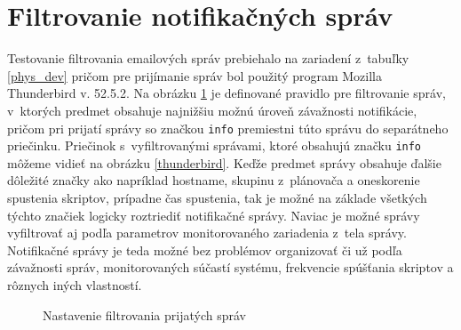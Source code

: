 \section{Filtrovanie notifikačných správ}
Testovanie filtrovania emailových správ prebiehalo na zariadení z~tabuľky \ref{phys_dev} pričom pre prijímanie správ bol použitý program Mozilla Thunderbird v. 52.5.2. Na obrázku \ref{thunderbird_filter_settings} je definované pravidlo pre filtrovanie správ, v~ktorých predmet obsahuje najnižšiu možnú úroveň závažnosti notifikácie, pričom pri prijatí správy so značkou \texttt{info} premiestni túto správu do separátneho priečinku. Priečinok s~vyfiltrovanými správami, ktoré obsahujú značku \texttt{info} môžeme vidieť na obrázku \ref{thunderbird}. Keďže predmet správy obsahuje ďalšie dôležité značky ako napríklad hostname, skupinu z~plánovača a oneskorenie spustenia skriptov, prípadne čas spustenia, tak je možné na základe všetkých týchto značiek logicky roztriediť notifikačné správy. Naviac je možné správy vyfiltrovať aj podľa parametrov monitorovaného zariadenia z~tela správy. Notifikačné správy je teda možné bez problémov organizovať či už podľa závažnosti správ, monitorovaných súčastí systému, frekvencie spúšťania skriptov a rôznych iných vlastností.
\\
\begin{figure}[H]
	\begin{center}
		\vspace{-0.5em}
		\caption{Nastavenie filtrovania prijatých správ}
		\label{thunderbird_filter_settings}
	\end{center}
\end{figure} 
